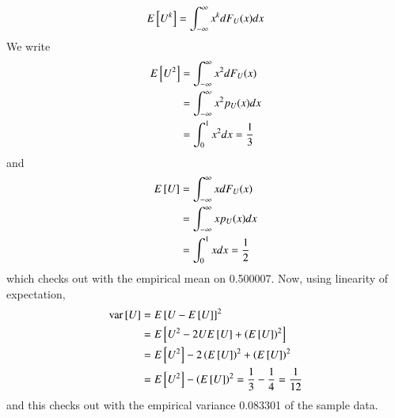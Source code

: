 \documentclass[journal,12pt,twocolumn]{IEEEtran}
\begin{document}
%
\begin{equation}
E{}\left[U^k\right] = \int_{-\infty}^{\infty}x^kdF_{U}(x)dx
\end{equation}
\solution
We write
\begin{align}
	E{}\left[U^2\right] &= \int_{-\infty}^{\infty}x^2dF_U(x) \\
	&= \int_{-\infty}^{\infty}x^2p_U(x)dx \\
	&= \int_{0}^{1}x^2dx = \frac{1}{3}
\end{align}
and
\begin{align}
	E{}\left[U\right] &= \int_{-\infty}^{\infty}xdF_U(x) \\
	&= \int_{-\infty}^{\infty}xp_U(x)dx \\
	&= \int_{0}^{1}xdx = \frac{1}{2}
\end{align}
which checks out with the empirical mean on 0.500007. Now, using linearity of expectation,
\begin{align}
	\text{var}{}\left[U\right] &= E{}\left[U - E{}\left[U\right]\right]^2 \\
	&= E{}\left[U^2 - 2UE{}\left[U\right] + \left(E{}\left[U\right]\right)^2\right] \\
	&= E{}\left[U^2\right] - 2\left(E{}\left[U\right]\right)^2 + \left(E{}\left[U\right]\right)^2 \\
	&= E{}\left[U^2\right] - \left(E{}\left[U\right]\right)^2 = \frac{1}{3} - \frac{1}{4} = \frac{1}{12}
\end{align}
and this checks out with the empirical variance 0.083301 of the sample data.
\end{document}
